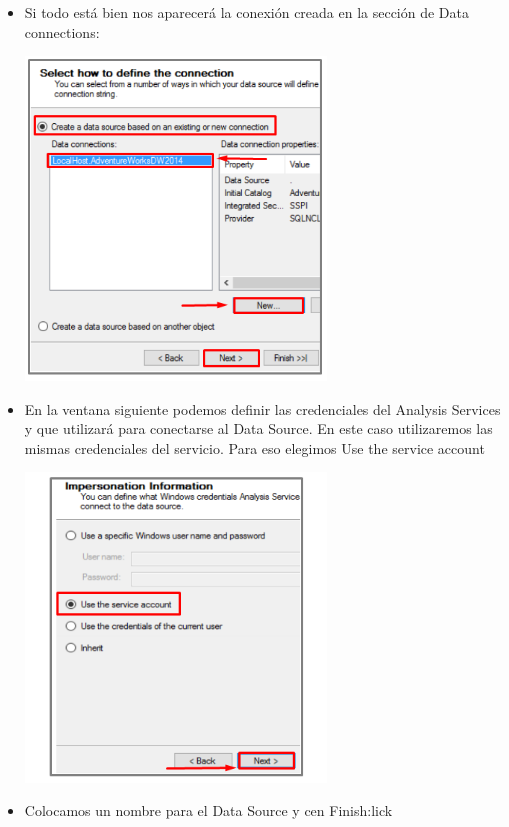 \begin{itemize}
\begin{center}
    \end{center}	
	 \item Si todo está bien nos aparecerá la conexión creada en la sección de Data connections:
	\begin{center}
	\includegraphics[width=8cm]{./Imagenes/img6}
    \end{center}	
	 \item En la ventana siguiente podemos definir las credenciales del Analysis Services y que utilizará para conectarse
al Data Source. En este caso utilizaremos las mismas credenciales del servicio. Para eso elegimos Use the
service account    
	\begin{center}
	\includegraphics[width=8cm]{./Imagenes/img7}
    \end{center}
	 \item Colocamos un nombre para el Data Source y cen Finish:lick     
	\begin{center}

\end{center}
\end{itemize}
